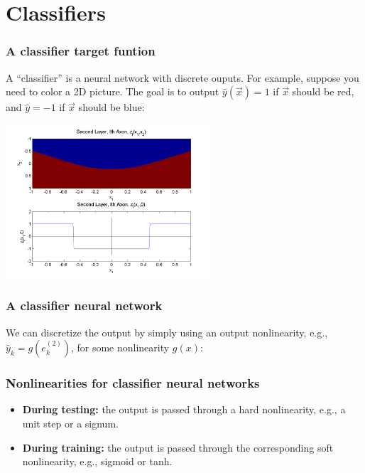 \documentclass{beamer}
\begin{document}
\section[Classifiers]{Classifiers}
\setcounter{subsection}{1}

\begin{frame}
  \frametitle{A classifier target funtion}

  A ``classifier'' is a neural network with discrete ouputs.  For
  example, suppose you need to color a 2D picture.  The goal is to
  output $\hat{y}(\vec{x})=1$ if $\vec{x}$ should be red, and
  $\hat{y}=-1$ if $\vec{x}$ should be blue:

  \centerline{\includegraphics[width=3in]{../lec07/figs/nn_axon2.png}}
\end{frame}

\begin{frame}
  \frametitle{A classifier neural network}
  We can discretize the output by simply using an output nonlinearity,
  e.g., $\hat{y}_k=g(e_k^{(2)})$, for some nonlinearity $g(x)$:
  \begin{small}\end{small}
\end{frame}

\begin{frame}
  \frametitle{Nonlinearities for classifier neural networks}

  \begin{itemize}
  \item {\bf During testing:} the output is passed through a hard
    nonlinearity, e.g., a unit step or a signum.
  \item {\bf During training:} the output is passed through the corresponding soft
    nonlinearity, e.g., sigmoid or tanh.
  \end{itemize}
\end{frame}
\end{document}
